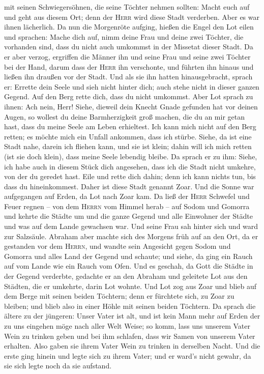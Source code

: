 mit seinen Schwiegersöhnen, die seine Töchter nehmen sollten: Macht euch
auf und geht aus diesem Ort; denn der \textsc{Herr} wird diese Stadt
verderben. Aber es war ihnen lächerlich.  Da nun die
Morgenröte aufging, hießen die Engel den Lot eilen und sprachen: Mache
dich auf, nimm deine Frau und deine zwei Töchter, die vorhanden sind,
dass du nicht auch umkommst in der Missetat dieser Stadt.
 Da er aber verzog, ergriffen die Männer ihn und seine
Frau und seine zwei Töchter bei der Hand, darum dass der \textsc{Herr}
ihn verschonte, und führten ihn hinaus und ließen ihn draußen vor der
Stadt.  Und als sie ihn hatten hinausgebracht, sprach er:
Errette dein Seele und sieh nicht hinter dich; auch stehe nicht in
dieser ganzen Gegend. Auf den Berg rette dich, dass du nicht umkommst.
 Aber Lot sprach zu ihnen: Ach nein, Herr!
 Siehe, dieweil dein Knecht Gnade gefunden hat vor deinen
Augen, so wollest du deine Barmherzigkeit groß machen, die du an mir
getan hast, dass du meine Seele am Leben erhieltest. Ich kann mich nicht
auf den Berg retten; es möchte mich ein Unfall ankommen, dass ich
stürbe.  Siehe, da ist eine Stadt nahe, darein ich
fliehen kann, und sie ist klein; dahin will ich mich retten (ist sie
doch klein), dass meine Seele lebendig bleibe.  Da sprach
er zu ihm: Siehe, ich habe auch in diesem Stück dich angesehen, dass ich
die Stadt nicht umkehre, von der du geredet hast.  Eile
und rette dich dahin; denn ich kann nichts tun, bis dass du
hineinkommest. Daher ist diese Stadt genannt Zoar.  Und
die Sonne war aufgegangen auf Erden, da Lot nach Zoar kam.
 Da ließ der \textsc{Herr} Schwefel und Feuer regnen --
von dem \textsc{Herrn} vom Himmel herab -- auf Sodom und Gomorra
 und kehrte die Städte um und die ganze Gegend und alle
Einwohner der Städte und was auf dem Lande gewachsen war.
 Und seine Frau sah hinter sich und ward zur Salzsäule.
 Abraham aber machte sich des Morgens früh auf an den
Ort, da er gestanden vor dem \textsc{Herrn},  und wandte
sein Angesicht gegen Sodom und Gomorra und alles Land der Gegend und
schaute; und siehe, da ging ein Rauch auf vom Lande wie ein Rauch vom
Ofen.  Und es geschah, da Gott die Städte in der Gegend
verderbte, gedachte er an den Abraham und geleitete Lot aus den Städten,
die er umkehrte, darin Lot wohnte.  Und Lot zog aus Zoar
und blieb auf dem Berge mit seinen beiden Töchtern; denn er fürchtete
sich, zu Zoar zu bleiben; und blieb also in einer Höhle mit seinen
beiden Töchtern.  Da sprach die ältere zu der jüngeren:
Unser Vater ist alt, und ist kein Mann mehr auf Erden der zu uns
eingehen möge nach aller Welt Weise;  so komm, lass uns
unserem Vater Wein zu trinken geben und bei ihm schlafen, dass wir Samen
von unserem Vater erhalten.  Also gaben sie ihrem Vater
Wein zu trinken in derselben Nacht. Und die erste ging hinein und legte
sich zu ihrem Vater; und er ward's nicht gewahr, da sie sich legte noch
da sie aufstand.

